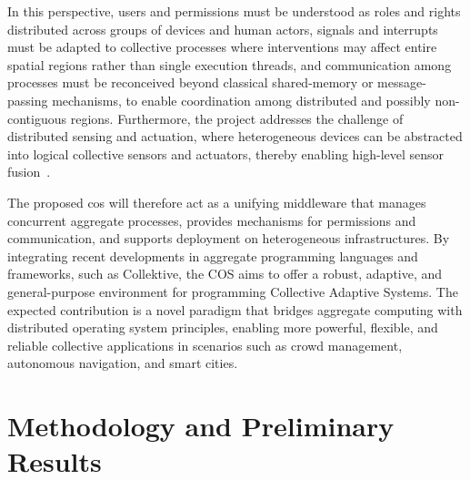 \documentclass[runningheads]{llncs}
\begin{document}
    In this perspective,
    users and permissions must be understood as roles and rights distributed across groups of devices and human actors,
    signals and interrupts must be adapted to collective processes where interventions may affect entire spatial regions rather than single execution threads,
    and communication among processes must be reconceived beyond classical shared-memory or message-passing mechanisms,
    to enable coordination among distributed and possibly non-contiguous regions.
    Furthermore,
    the project addresses the challenge of distributed sensing and actuation,
    where heterogeneous devices can be abstracted into logical collective sensors and actuators,
    thereby enabling high-level sensor fusion~\cite{DBLP:journals/arc/Sasiadek02}.

    The proposed \ac{cos} will therefore act as a unifying middleware that manages concurrent aggregate processes,
    provides mechanisms for permissions and communication,
    and supports deployment on heterogeneous infrastructures.
    By integrating recent developments in aggregate programming languages and frameworks,
    such as Collektive, the COS aims to offer a robust, adaptive,
    and general-purpose environment for programming Collective Adaptive Systems.
    The expected contribution is a novel paradigm that bridges aggregate computing with distributed operating system principles,
    enabling more powerful, flexible,
    and reliable collective applications in scenarios such as crowd management, autonomous navigation, and smart cities.

    \section{Methodology and Preliminary Results}\label{sec:methodology}
\end{document}
